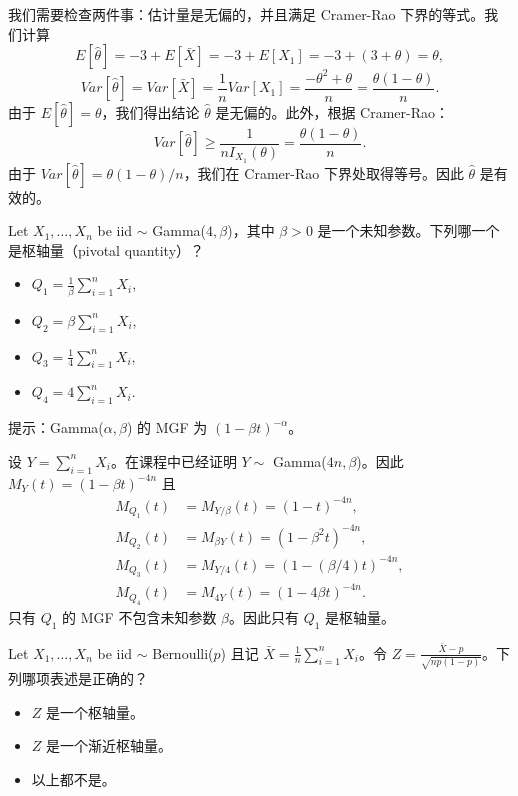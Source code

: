 \begin{questions}
\begin{solution}
我们需要检查两件事：估计量是无偏的，并且满足 Cramer-Rao 下界的等式。我们计算
\[
E[\hat{\theta}] = -3 + E[\bar{X}] = -3 + E[X_1] = -3 + (3 + \theta) = \theta,
\]
\[
Var[\hat{\theta}] = Var[\bar{X}] = \frac{1}{n} Var[X_1] = \frac{-\theta^2 + \theta}{n} = \frac{\theta(1 - \theta)}{n}.
\]
由于 $E[\hat{\theta}] = \theta$，我们得出结论 $\hat{\theta}$ 是无偏的。此外，根据 Cramer-Rao：
\[
Var[\hat{\theta}] \ge \frac{1}{n I_{X_1}(\theta)} = \frac{\theta(1 - \theta)}{n}.
\]
由于 $Var[\hat{\theta}] = \theta(1 - \theta)/n$，我们在 Cramer-Rao 下界处取得等号。因此 $\hat{\theta}$ 是有效的。
\end{solution}

\question Let $X_1, \dots, X_n$ be iid $\sim$ Gamma($4, \beta$)，其中 $\beta > 0$ 是一个未知参数。下列哪一个是枢轴量（pivotal quantity）？
\begin{itemize}
    \item $Q_1 = \frac{1}{\beta} \sum_{i=1}^n X_i$,
    \item $Q_2 = \beta \sum_{i=1}^n X_i$,
    \item $Q_3 = \frac{1}{4} \sum_{i=1}^n X_i$,
    \item $Q_4 = 4 \sum_{i=1}^n X_i$.
\end{itemize}
提示：Gamma($\alpha, \beta$) 的 MGF 为 $(1 - \beta t)^{-\alpha}$。

\begin{solution}
设 $Y = \sum_{i=1}^n X_i$。在课程中已经证明 $Y \sim$ Gamma($4n, \beta$)。因此 $M_Y(t) = (1 - \beta t)^{-4n}$ 且
\begin{align*}
M_{Q_1}(t) &= M_{Y/\beta}(t) = (1 - t)^{-4n}, \\
M_{Q_2}(t) &= M_{\beta Y}(t) = (1 - \beta^2 t)^{-4n}, \\
M_{Q_3}(t) &= M_{Y/4}(t) = \left( 1 - \left( \beta / 4 \right) t \right)^{-4n}, \\
M_{Q_4}(t) &= M_{4Y}(t) = (1 - 4\beta t)^{-4n}.
\end{align*}
只有 $Q_1$ 的 MGF 不包含未知参数 $\beta$。因此只有 $Q_1$ 是枢轴量。
\end{solution}

\question Let $X_1, \dots, X_n$ be iid $\sim$ Bernoulli($p$) 且记 $\bar{X} = \frac{1}{n} \sum_{i=1}^n X_i$。令 $Z = \frac{\bar{X} - p}{\sqrt{np(1-p)}}$。下列哪项表述是正确的？
\begin{itemize}
    \item $Z$ 是一个枢轴量。
    \item $Z$ 是一个渐近枢轴量。
    \item 以上都不是。
\end{itemize}


\end{questions}
